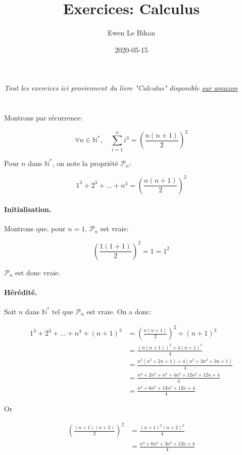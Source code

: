\documentclass{article}
\title{Exercices: Calculus}
\author{Ewen Le Bihan}
\date{2020-05-15}
\newcommand{\N}{\mathds{N}}
\newcommand{\spliteq}[1]{\begin{equation*}\begin{split}#1\end{split}\end{equation*}}
\begin{document}
\maketitle

\begin{center}
	\emph{Tout les exercices ici proviennent du livre "Calculus" disponible 
	\href{https://www.amazon.fr/Calculus-\%C3\%A9dition-approfondir-connaissances-math\%C3\%A9matiques/dp/2820807178/}{\underline{sur amazon}}}
\end{center}
\section{}

Montrons par récurrence:

\[
	\forall n \in \N^\ast, \quad \sum_{i=1}^{n} i^3 = \left( \frac{n(n+1)}{2} \right)^2
\]

Pour $n$ dans $\N^\ast$, on note la propriété $\mathcal{P}_n$:

\[
	1^3 + 2^3 + \dots + n^3 = \left( \frac{n(n+1)}{2} \right)^2	
\]

\paragraph{Initialisation.} Montrons que, pour $n = 1$, $\mathcal{P}_n$ est vraie:

\[
	\left(\frac{1(1+1)}{2}\right)^2 = 1 = 1^2
\]

$\mathcal{P}_n$ est donc vraie.

\paragraph{Hérédité.} Soit $n$ dans $\N^\ast$ tel que $\mathcal{P}_n$ est vraie. 
On a donc:

\spliteq{
	1^3 + 2^3 + \dots + n^3 + (n+1)^3 &= \left( \frac{n(n+1)}{2} \right)^2 + (n+1)^3 \\
					  &= \frac{(n(n+1))^2 + 4(n+1)^3}{4} \\
					  &= \frac{n^2(n^2+2n+1) + 4(n^3+3n^2+3n+1)}{4} \\
					  &= \frac{n^4+2n^3+n^2+4n^3+12n^2+12n+4}{4} \\
					  &= \frac{n^4+6n^3+13n^2+12n+4}{4}
}

Or

\spliteq{
	\left( \frac{(n+1)(n+2)}{2} \right)^2 &= \frac{(n+1)^2(n+2)^2}{4} \\
					      &= \frac{n^4+6n^3+3n^2+12n+4}{4}
}
\end{document}
